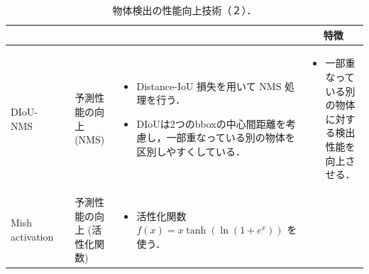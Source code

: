 \documentclass[originalpaper,fleqn]{jsaiart}     %
\begin{document}
\begin{table}
    \caption{物体検出の性能向上技術（２）．}
    \label{tbl-option2}
    \begin{center}
        \setlength{\tabcolsep}{3pt}
        \footnotesize
        \begin{tabularx}{\linewidth}{Xp{1.5cm}Xp{7cm}X} \toprule
            \centering{技術名称} & \centering{文献} & \centering{用途} & \centering{概要} & \multicolumn{1}{c}{特徴} \\ \midrule

            DIoU-NMS
            & \cite{ZWLLYR20} & 予測性能の向上 (NMS) & 
            \begin{itemize}
                \vspace{-0.7\baselineskip}
                \setlength{\leftskip}{-3mm}
                \item Distance-IoU 損失を用いて NMS 処理を行う．
                \item DIoUは2つのbboxの中心間距離を考慮し，一部重なっている別の物体を区別しやすくしている．
            \end{itemize}
            &
            \begin{itemize}
                \vspace{-0.7\baselineskip}
                \setlength{\leftskip}{-3mm}
                \item 一部重なっている別の物体に対する検出性能を向上させる．
            \end{itemize}
            \\

            Mish activation
            & \cite{Misra20} & 予測性能の向上 (活性化関数) 
            \vspace{0.7\baselineskip}
            & 
            \begin{itemize}
                \vspace{-0.7\baselineskip}
                \setlength{\leftskip}{-3mm}
                \item 活性化関数 $f(x) = x \tanh(\ln(1 + e^x))$ を使う．
            \end{itemize}
            &
            \\


\end{tabularx}
\end{center}
\end{table}
\end{document}
